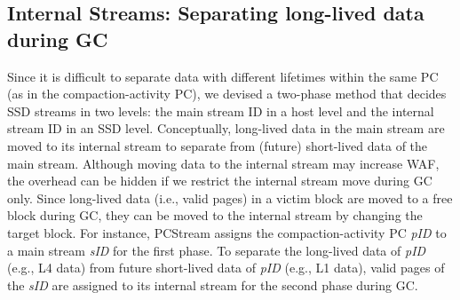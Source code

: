 \subsection{Internal Streams: Separating long-lived data during GC}
Since it is difficult to separate data with different lifetimes within the same PC 
(as in the compaction-activity PC), we devised a two-phase method that decides SSD 
streams in two levels: the main stream ID in a host level and the internal stream ID in an SSD level.
Conceptually, long-lived data in the main stream are moved to its internal stream to 
separate from (future) short-lived data of the main stream.
Although moving data to the internal stream may increase WAF,
the overhead can be hidden if we restrict the internal stream move during GC only.
Since long-lived data (i.e., valid pages) in a victim block are moved to a free block during GC, 
they can be moved to the internal stream by changing the target block.
For instance, \textsf{\small PCStream} assigns the compaction-activity PC {\it pID} to a
main stream {\it sID} for the first phase.
To separate the long-lived data of {\it pID} (e.g., L4 data) 
from future short-lived data of {\it pID} (e.g., L1 data), 
valid pages of the {\it sID} are assigned to its internal stream for the second phase during GC.




